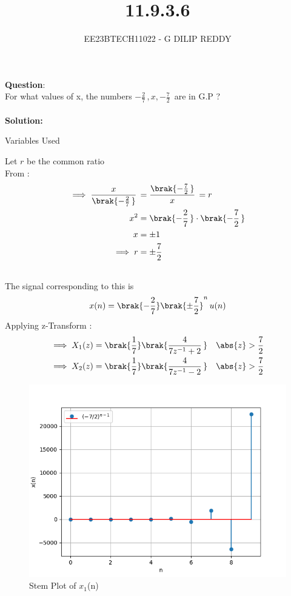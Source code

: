 \documentclass[journal,12pt,twocolumn]{IEEEtran}
\theoremstyle{remark}
\begin{document}

\vspace{3cm}

\title{11.9.3.6}
\author{EE23BTECH11022 - G DILIP REDDY}
\maketitle
\newpage

\bigskip

\renewcommand{\thefigure}{\theenumi}
\renewcommand{\thetable}{\theenumi}
\textbf{Question}:\\
For what values of x, the numbers $-\frac{2}{7}\,,x,-\frac{7}{2}\,$ are in G.P ?
\\\\
\textbf{Solution: }\\
\fi
\begin{table}[h]
    \centering
    
    \caption{Variables Used}
    \label{tab:table_11.9.3.6}
\end{table}
Let $r$ be the common ratio\\
From :
\begin{align}
\implies \frac{x}{\brak{-\frac{2}{7}\,}}\,&= \frac{\brak{-\frac{7}{2}\,}}{x}\,=r \\
x^2&=\brak{-\frac{2}{7}\,}\cdot\brak{-\frac{7}{2}\,}\\
x&=\pm 1\\
\implies r&=\pm \frac{7}{2}\,\\\notag
\end{align}
The signal corresponding to this is 
\begin{align}
x(n)=\brak{-\frac{2}{7}}\brak{\pm \frac{7}{2}}^n\,u(n)
\end{align}
Applying z-Transform :
\begin{align}
\implies X_1(z)&=\brak{\frac{1}{7}}\brak{\frac{4}{7z^{-1}+2}\,}
\quad \abs{z}>\frac{7}{2}\\
\implies X_2(z)&=\brak{\frac{1}{7}}\brak{\frac{4}{7z^{-1}-2}\,}
\quad \abs{z}>\frac{7}{2}
\end{align}
\begin{figure}[h]
    \centering
    \includegraphics[width=1.1\linewidth]{ncert-maths/11/9/3/6/figs/graph1.png}
    \caption{Stem Plot of $x_1$(n)}
    \label{stemplot1}
\end{figure}
\end{document}
